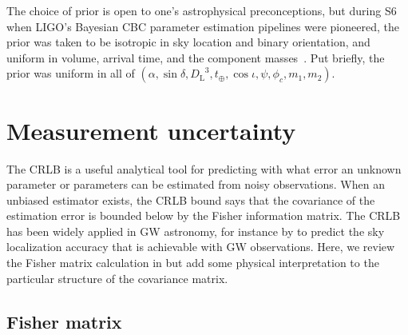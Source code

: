 \documentclass{iopart}
\begin{document}
The choice of prior is open to one's astrophysical preconceptions, but during \ac{S6} when \ac{LIGO}'s Bayesian \ac{CBC} parameter estimation pipelines were pioneered, the prior was taken to be isotropic in sky location and binary orientation, and uniform in volume, arrival time, and the component masses~\cite{2013arXiv1304.1775T}. Put briefly, the prior was uniform in all of $(\alpha, \sin\delta, {D_\mathrm{L}}^3, t_\oplus, \cos\iota, \psi, \phi_c, m_1, m_2)$.

\section{Measurement uncertainty}

The \ac{CRLB} is a useful analytical tool for predicting with what error an unknown parameter or parameters can be estimated from noisy observations. When an unbiased estimator exists, the \ac{CRLB} bound says that the covariance of the estimation error is bounded below by the Fisher information matrix. The \ac{CRLB} has been widely applied in \ac{GW} astronomy, for instance by \cite{fairhurst:2009} to predict the sky localization accuracy that is achievable with \ac{GW} observations. Here, we review the Fisher matrix calculation in \cite{fairhurst:2009} but add some physical interpretation to the particular structure of the covariance matrix.

\subsection{Fisher matrix}
\end{document}

